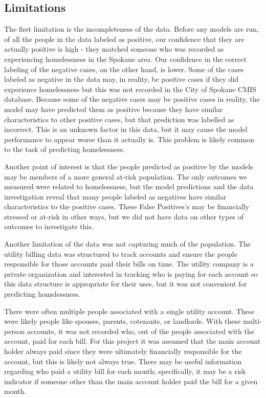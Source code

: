 \documentclass[10pt,letterpaper]{article}
\newcommand{\red}[1]{{\color{red}{#1}}}
\begin{document}
\red{add that more appropriate methods could be used to deal with time series - LSTM}

\subsection*{Limitations}
The first limitation is the incompleteness of the data. Before any models are run, of all the people in the data labeled as positive, our confidence that they are actually positive is high - they matched someone who was recorded as experiencing homelessness in the Spokane area. Our confidence in the correct labeling of the negative cases, on the other hand, is lower. Some of the cases labeled as negative in the data may, in reality, be positive cases if they did experience homelessness but this was not recorded in the City of Spokane CMIS database. Because some of the negative cases may be positive cases in reality, the model may have predicted them as positive because they have similar characteristics to other positive cases, but that prediction was labelled as incorrect. This is an unknown factor in this data, but it may cause the model performance to appear worse than it actually is. This problem is likely common to the task of predicting homelessness. \red{add citation}

Another point of interest is that the people predicted as positive by the models may be members of a more general at-risk population. The only outcomes we measured were related to homelessness, but the model predictions and the data investigation reveal that many people labeled as negatives have similar characteristics to the positive cases. These False Positives's may be financially stressed or at-risk in other ways, but we did not have data on other types of outcomes to investigate this. \red{add info about Bryne's study - high prediction associated with drug addiction}

Another limitation of the data was not capturing much of the population. The utility billing data was structured to track accounts and ensure the people responsible for those accounts paid their bills on time. The utility company is a private organization and interested in tracking who is paying for each account so this data structure is appropriate for their uses, but it was not convenient for predicting homelessness.

There were often multiple people associated with a single utility account. These were likely people like spouses, parents, cotenants, or landlords. With these multi-person accounts, it was not recorded who, out of the people associated with the account, paid for each bill. For this project it was assumed that the main account holder always paid since they were ultimately financially responsible for the account, but this is likely not always true. There may be useful information regarding who paid a utility bill for each month; specifically, it may be a risk indicator if someone other than the main account holder paid the bill for a given month.
\end{document}
